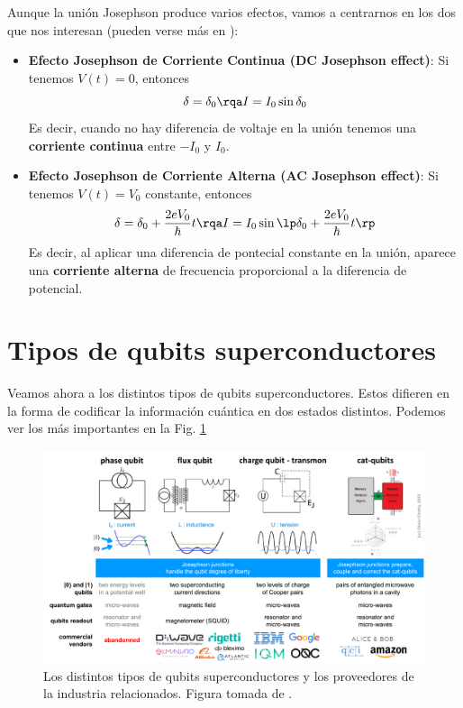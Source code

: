 Aunque la unión Josephson produce varios efectos, vamos a centrarnos en los dos que nos interesan (pueden verse más en \cite{bib_scq_Waldram}):
\begin{itemize}
	\item \textbf{Efecto Josephson de Corriente Continua (DC Josephson effect)}: Si tenemos $V(t)=0$, entonces 
	\begin{equation}
	\delta = \delta_0 \rqa I = I_0 \sin \delta_0
	\end{equation}
	Es decir, cuando no hay diferencia de voltaje en la unión tenemos una \textbf{corriente continua} entre $-I_0$ y $I_0$.
	
	\item \textbf{Efecto Josephson de Corriente Alterna (AC Josephson effect)}: Si tenemos $V(t) = V_0$ constante, entonces
	\begin{equation}
	\delta = \delta_0 + \frac{2eV_0}{\hbar} t \rqa I = I_0 \sin \lp \delta_0 + \frac{2eV_0}{\hbar} t  \rp
	\end{equation}
	Es decir, al aplicar una diferencia de pontecial constante en la unión, aparece una \textbf{corriente alterna} de frecuencia proporcional a la diferencia de potencial.
	
\end{itemize}




\section{Tipos de qubits superconductores}

Veamos ahora a los distintos tipos de qubits superconductores. Estos difieren en la forma de codificar la información cuántica en dos estados distintos. Podemos ver los más importantes en la Fig. \ref{Fig_scq_tipos_qubits_superconductores}

	\begin{figure}[t]
	\centering 
	\includegraphics[width=1\linewidth]{Figuras/Fig_scq_tipos_qubits_superconductores.png}
	\caption{Los distintos tipos de qubits superconductores y los proveedores de la industria relacionados. Figura tomada de \cite{bib_scq_ezratty2023perspective}.}
	\label{Fig_scq_tipos_qubits_superconductores}
	\end{figure}




